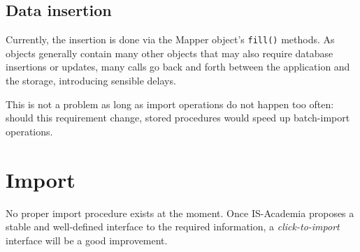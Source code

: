 \subsection{Data insertion}
Currently, the insertion is done via the Mapper object's \verb|fill()| methods. As objects generally contain many other objects that may also require database insertions or updates, many calls go back and forth between the application and the storage, introducing sensible delays.

This is not a problem as long as import operations do not happen too often: should this requirement change, stored procedures would speed up batch-import operations.

\section{Import}
No proper import procedure exists at the moment. Once IS-Academia proposes a stable and well-defined interface to the required information, a \emph{click-to-import} interface will be a good improvement. 


